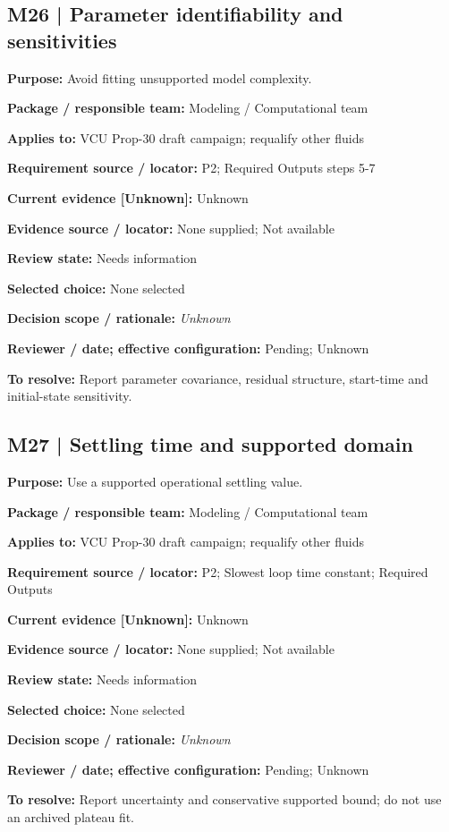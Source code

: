 \documentclass[11pt]{article}
\begin{document}
\begin{minipage}{\textwidth}\small\setlength{\parskip}{2pt}
\subsection*{M26 | Parameter identifiability and sensitivities}
\textbf{Purpose:} Avoid fitting unsupported model complexity.\par
\textbf{Package / responsible team:} Modeling / Computational team\par
\textbf{Applies to:} VCU Prop-30 draft campaign; requalify other fluids\par
\textbf{Requirement source / locator:} P2; Required Outputs steps 5-7\par
\textbf{Current evidence [Unknown]:} Unknown\par
\textbf{Evidence source / locator:} None supplied; Not available\par
\textbf{Review state:} Needs information\par
\textbf{Selected choice:} None selected\par
\textbf{Decision scope / rationale:} \textit{Unknown}\par
\textbf{Reviewer / date; effective configuration:} Pending; Unknown\par
\textbf{To resolve:} Report parameter covariance, residual structure, start-time and initial-state sensitivity.\par
\end{minipage}\par\vspace{5pt}
\begin{minipage}{\textwidth}\small\setlength{\parskip}{2pt}
\subsection*{M27 | Settling time and supported domain}
\textbf{Purpose:} Use a supported operational settling value.\par
\textbf{Package / responsible team:} Modeling / Computational team\par
\textbf{Applies to:} VCU Prop-30 draft campaign; requalify other fluids\par
\textbf{Requirement source / locator:} P2; Slowest loop time constant; Required Outputs\par
\textbf{Current evidence [Unknown]:} Unknown\par
\textbf{Evidence source / locator:} None supplied; Not available\par
\textbf{Review state:} Needs information\par
\textbf{Selected choice:} None selected\par
\textbf{Decision scope / rationale:} \textit{Unknown}\par
\textbf{Reviewer / date; effective configuration:} Pending; Unknown\par
\textbf{To resolve:} Report uncertainty and conservative supported bound; do not use an archived plateau fit.\par
\end{minipage}\par\vspace{5pt}
\end{document}
